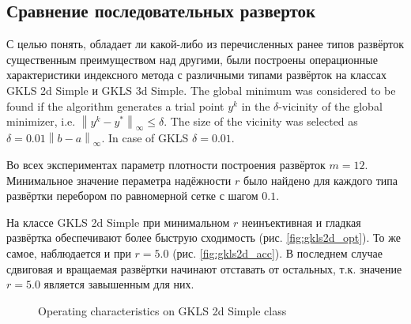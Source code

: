 \documentclass[runningheads]{llncs}
\begin{document}
\subsection{Сравнение последовательных разверток}
\label{sec:seq_comp}
\begin{Russian}
С целью понять, обладает ли какой-либо из перечисленных ранее типов развёрток существенным преимуществом над другими, были построены операционные характеристики индексного метода с различными типами развёрток на классах GKLS 2d Simple и GKLS 3d Simple. The global minimum was considered to be found if the algorithm generates a trial point $y^k$ in the $\delta$-vicinity of the global minimizer, i.e. $\left\|y^k-y^\ast\right\|_\infty\leq\delta$. The size of the vicinity was selected as $\delta = 0.01\left\|b-a\right\|_\infty$. In case of GKLS $\delta=0.01$.

Во всех экспериментах параметр плотности построения развёрток $m=12$. Минимальное значение пераметра надёжности \(r\) было найдено для каждого типа развёртки перебором по равномерной сетке с шагом \(0.1\).

На классе GKLS 2d Simple при минимальном \(r\) неинъективная и гладкая развёртка обеспечивают более быструю сходимость (рис. \ref{fig:gkls2d_opt}). То же самое, наблюдается и при \(r=5.0\) (рис. \ref{fig:gkls2d_acc}). В последнем случае сдвиговая и вращаемая развёртки начинают отставать от остальных, т.к. значение \(r=5.0\) является завышенным для них.
\begin{figure}[ht]
    \centering
    \caption{Operating characteristics on GKLS 2d Simple class}
\end{figure}


\end{Russian}
\end{document}
